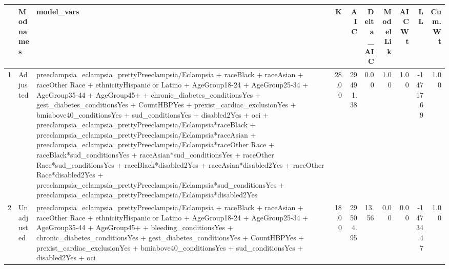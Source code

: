 \begin{table}[ht]
\centering
\begin{tabular}{rllrrrrrrr}
  \hline
 & Modnames & model\_vars & K & AIC & Delta\_AIC & ModelLik & AICWt & LL & Cum.Wt \\ 
  \hline
1 & Adjusted & preeclampsia\_eclampsia\_prettyPreeclampsia/Eclampsia + raceBlack + raceAsian + raceOther Race + ethnicityHispanic or Latino + AgeGroup18-24 + AgeGroup25-34 + AgeGroup35-44 + AgeGroup45+ + chronic\_diabetes\_conditionsYes + gest\_diabetes\_conditionsYes + CountHBPYes + prexist\_cardiac\_exclusionYes + bmiabove40\_conditionsYes + sud\_conditionsYes + disabled2Yes + oci + preeclampsia\_eclampsia\_prettyPreeclampsia/Eclampsia*raceBlack + preeclampsia\_eclampsia\_prettyPreeclampsia/Eclampsia*raceAsian + preeclampsia\_eclampsia\_prettyPreeclampsia/Eclampsia*raceOther Race + raceBlack*sud\_conditionsYes + raceAsian*sud\_conditionsYes + raceOther Race*sud\_conditionsYes + raceBlack*disabled2Yes + raceAsian*disabled2Yes + raceOther Race*disabled2Yes + preeclampsia\_eclampsia\_prettyPreeclampsia/Eclampsia*sud\_conditionsYes + preeclampsia\_eclampsia\_prettyPreeclampsia/Eclampsia*disabled2Yes & 28.00 & 29491.38 & 0.00 & 1.00 & 1.00 & -14717.69 & 1.00 \\ 
  2 & Unadjusted & preeclampsia\_eclampsia\_prettyPreeclampsia/Eclampsia + raceBlack + raceAsian + raceOther Race + ethnicityHispanic or Latino + AgeGroup18-24 + AgeGroup25-34 + AgeGroup35-44 + AgeGroup45+ + bleeding\_conditionsYes + chronic\_diabetes\_conditionsYes + gest\_diabetes\_conditionsYes + CountHBPYes + prexist\_cardiac\_exclusionYes + bmiabove40\_conditionsYes + sud\_conditionsYes + disabled2Yes + oci & 18.00 & 29504.95 & 13.56 & 0.00 & 0.00 & -14734.47 & 1.00 \\ 
   \hline
\end{tabular}
\end{table}
